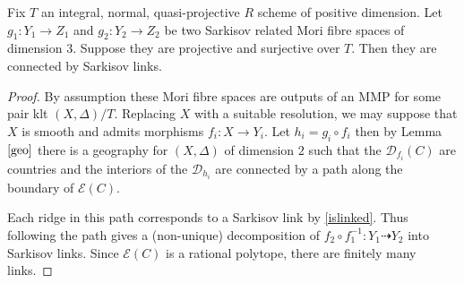 	\begin{theorem}\label{sarkisov}
		Fix $T$ an integral, normal, quasi-projective $R$ scheme of positive dimension. Let $g_{1}:Y_{1} \to Z_{1}$ and $g_{2}:Y_{2} \to Z_{2}$ be two Sarkisov related Mori fibre spaces of dimension $3$. Suppose they are projective and surjective over $T$. Then they are connected by Sarkisov links.
	\end{theorem}

	\begin{proof}
		
		By assumption these Mori fibre spaces are outputs of an MMP for some pair klt $(X,\Delta)/T$. Replacing $X$ with a suitable resolution, we may suppose that $X$ is smooth and admits morphisms $f_{i}:X \to Y_{i}$. Let $h_{i}=g_{i} \circ f_{i}$ then by Lemma $\ref{geo}$ there is a geography for $(X,\Delta)$ of dimension $2$ such that the $\mathcal{D}_{f_{i}}(C)$ are countries and the interiors of the $\mathcal{D}_{h_{i}}$ are connected by a path along the boundary of $\mathcal{E}(C)$. 
		
		Each ridge in this path corresponds to a Sarkisov link by \autoref{islinked}. Thus following the path gives a (non-unique) decomposition of $f_{2} \circ f_{1}^{-1} \colon Y_{1} \dashrightarrow Y_{2}$ into Sarkisov links. Since $\mathcal{E}(C)$ is a rational polytope, there are finitely many links.
		
		
	\end{proof}

%	
%	
%	
%

